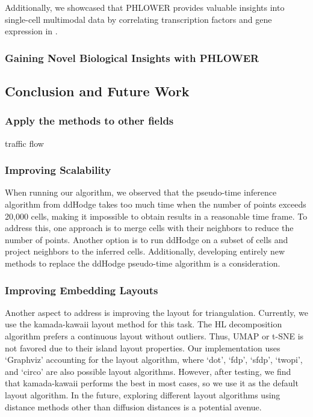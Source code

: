 Additionally, we showcased that PHLOWER provides valuable insights into single-cell multimodal data by correlating transcription factors and gene expression in .


\subsubsection{Gaining Novel Biological Insights with PHLOWER}

\subsection{Conclusion and Future Work}

\subsubsection{Apply the methods to other fields}
traffic flow

\subsubsection{Improving Scalability}
When running our algorithm, we observed that the pseudo-time inference algorithm from ddHodge takes too much time when the number of points exceeds 20,000 cells, making it impossible to obtain results in a reasonable time frame. To address this, one approach is to merge cells with their neighbors to reduce the number of points. Another option is to run ddHodge on a subset of cells and project neighbors to the inferred cells. Additionally, developing entirely new methods to replace the ddHodge pseudo-time algorithm is a consideration.

\subsubsection{Improving Embedding Layouts}
Another aspect to address is improving the layout for triangulation. Currently, we use the kamada-kawaii layout method for this task. The HL decomposition algorithm prefers a continuous layout without outliers. Thus, UMAP or t-SNE is not favored due to their island layout properties. Our implementation uses `Graphviz' accounting for the layout algorithm, where `dot', `fdp', `sfdp', `twopi', and `circo' are also possible layout algorithms. However, after testing, we find that kamada-kawaii performs the best in most cases, so we use it as the default layout algorithm. In the future, exploring different layout algorithms using distance methods other than diffusion distances is a potential avenue.

